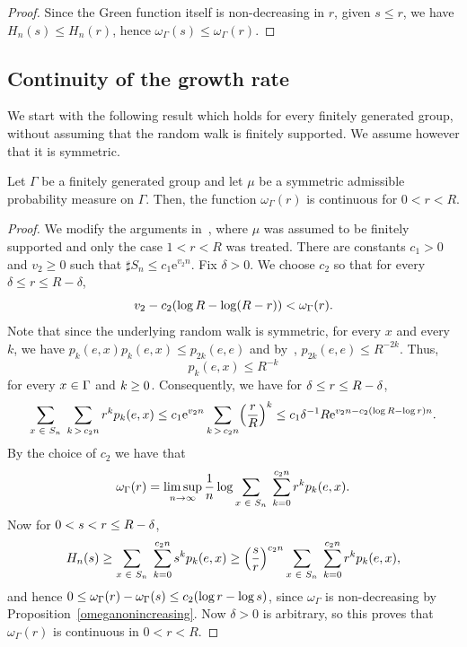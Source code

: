 \documentclass[10pt]{amsart}
\theoremstyle{definition}\newtheorem{defi}[theo]{Definition}\newtheorem{rema}[theo]{Remark}\newtheorem{exam}[theo]{Example}\newtheorem{exem}[theo]{Example}\newtheorem{nota}[theo]{Notation}
\newcommand{\rme}{\mathrm{e}}
\let\originalleft\left
\let\originalright\right
\renewcommand{\left}{\mathopen{}\mathclose\bgroup\originalleft}
\renewcommand{\right}{\aftergroup\egroup\originalright}
\let\oldin\in
\renewcommand{\in}{\mathchoice{\oldin}{\oldin}{\,\oldin\,}{\,\oldin\,}}
\let\oldge\ge
\renewcommand{\ge}{\mathchoice{\oldge}{\oldge}{\,\oldge\,}{\,\oldge\,}}
\let\oldle\le
\renewcommand{\le}{\mathchoice{\oldle}{\oldle}{\,\oldle\,}{\,\oldle\,}}
\renewcommand*{\to}{\mathchoice{\longrightarrow}{\rightarrow}{\rightarrow}{\rightarrow}}
\begin{document}
\begin{proof}
Since the Green function itself is non-decreasing in $r$, given $s\leq r$, we have $H_n(s)\leq H_n(r)$, hence $\omega_\Gamma(s)\leq \omega_\Gamma(r)$.
\end{proof}

\subsection{Continuity of the growth rate}

We start with the following result which holds for every finitely generated group, without assuming that the random walk is finitely supported. We assume however that it is symmetric.

\begin{prop}\label{omegaGcont}
Let $\Gamma$ be a finitely generated group and let $\mu$ be a symmetric admissible probability measure on $\Gamma$. Then, the function $\omega_{\Gamma}(r)$ is continuous for $0 < r < R$.
\end{prop}


\begin{proof}
We modify the arguments in~\cite[Lemma~3.1]{DWY}, where $\mu$ was assumed to be finitely supported and only the case $1<r<R$ was treated. There are constants $c_1 > 0$ and $v_2 \geq 0$ such that $\sharp S_n \leq c_1 \rme^{v_2 n}$. Fix $\delta > 0$. We choose $c_2$ so that for every $\delta \leq r \leq R - \delta$,
\[
v_2 - c_2 \left(\log R - \log (R - r) \right) < \omega_{\Gamma}(r).
\]
Note that since the underlying random walk is symmetric, for every $x$ and every $k$, we have $p_k(e,x)p_k(e,x)\leq p_{2k}(e,e)$ and by~\cite[Lemma~1.9]{Woessbook}, $p_{2k}(e,e)\leq R^{-2k}$. Thus,
\begin{equation}\label{decayheatkernel}
p_k(e, x) \leq R^{-k}
\end{equation}
for every $x \in \Gamma$ and $k \ge 0$. Consequently, we have for $\delta \le r \le R - \delta$,
\[
\sum_{x \in S_n}\;\sum_{k\,>\,c_2 n} r^k p_k(e, x) \le c_1 \rme^{v_2 n} \sum_{k\,>\,c_2 n} \left(\frac{r}{R} \right)^k \le c_1 \delta^{-1} R \rme^{v_2 n - c_2 \left(\log R - \log r \right) n}.
\]
By the choice of $c_2$ we have that
\[
\omega_{\Gamma}(r) = \limsup_{n \to \infty} \frac{1}{n} \log \sum_{x \in S_n}\;\sum_{k=0}^{c_2 n} r^k p_k(e, x).
\]
Now for $0 < s < r \le R - \delta$,
\[
H_n(s) \geq \sum_{x \in S_n}\;\sum_{k = 0}^{c_2 n} s^k p_k(e, x)
\ge \left(\frac{s}{r} \right)^{c_2 n} \sum_{x \in S_n}\;\sum_{k = 0}^{c_2 n} r^k p_k(e, x),
\]
and hence $0 \leq \omega_{\Gamma}(r) - \omega_\Gamma(s) \le c_2 (\log r - \log s )$, since $\omega_\Gamma$ is non-decreasing by Proposition~\ref{omeganonincreasing}. Now $\delta > 0$ is arbitrary, so this proves that $\omega_{\Gamma}(r)$ is continuous in $0 < r < R$.
\end{proof}
\end{document}
